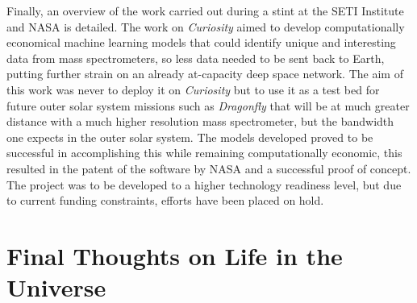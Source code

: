 Finally, an overview of the work carried out during a stint at the SETI Institute and NASA is detailed. The work on \textit{Curiosity} aimed to develop computationally economical machine learning models that could identify unique and interesting data from mass spectrometers, so less data needed to be sent back to Earth, putting further strain on an already at-capacity deep space network. The aim of this work was never to deploy it on \textit{Curiosity} but to use it as a test bed for future outer solar system missions such as \textit{Dragonfly} that will be at much greater distance with a much higher resolution mass spectrometer, but the bandwidth one expects in the outer solar system. The models developed proved to be successful in accomplishing this while remaining computationally economic, this resulted in the patent of the software by NASA and a successful proof of concept. The project was to be developed to a higher technology readiness level, but due to current funding constraints, efforts have been placed on hold. 

\newpage
\section{Final Thoughts on Life in the Universe}

